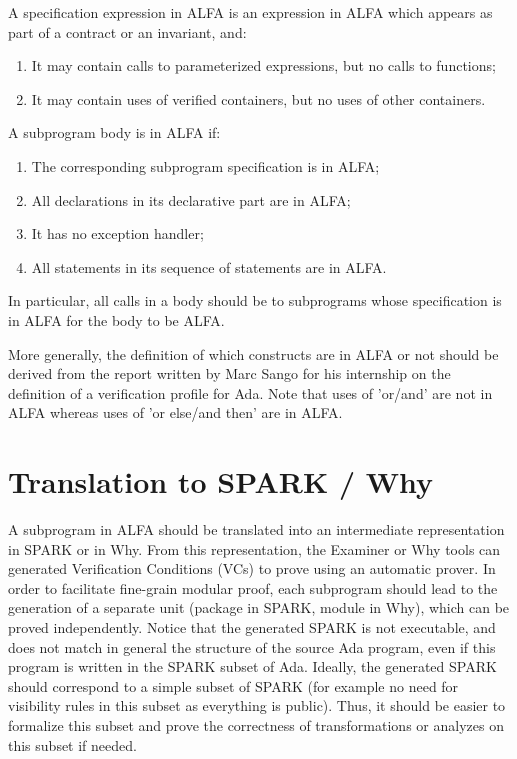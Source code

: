 \documentclass{article}
\begin{document}
A specification expression in ALFA is an expression in ALFA which appears as
part of a contract or an invariant, and:
\begin{enumerate}
\item It may contain calls to parameterized expressions, but no calls to
  functions;
\item It may contain uses of verified containers, but no uses of other
  containers.
\end{enumerate}

A subprogram body is in ALFA if:
\begin{enumerate}
\item The corresponding subprogram specification is in ALFA;
\item All declarations in its declarative part are in ALFA;
\item It has no exception handler;
\item All statements in its sequence of statements are in ALFA.
\end{enumerate}

In particular, all calls in a body should be to subprograms whose specification
is in ALFA for the body to be ALFA.

More generally, the definition of which constructs are in ALFA or not should be
derived from the report written by Marc Sango for his internship on the
definition of a verification profile for Ada. Note that uses of 'or/and' are
not in ALFA whereas uses of 'or else/and then' are in ALFA.

\section{Translation to SPARK / Why}

A subprogram in ALFA should be translated into an intermediate representation
in SPARK or in Why. From this representation, the Examiner or Why tools can
generated Verification Conditions (VCs) to prove using an automatic prover.  In
order to facilitate fine-grain modular proof, each subprogram should lead to
the generation of a separate unit (package in SPARK, module in Why), which can
be proved independently. Notice that the generated SPARK is not executable, and
does not match in general the structure of the source Ada program, even if this
program is written in the SPARK subset of Ada. Ideally, the generated SPARK
should correspond to a simple subset of SPARK (for example no need for
visibility rules in this subset as everything is public). Thus, it should be
easier to formalize this subset and prove the correctness of transformations or
analyzes on this subset if needed.
\end{document}

